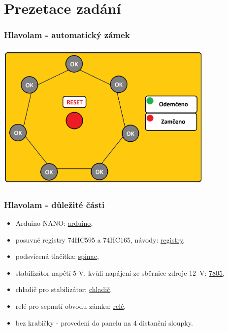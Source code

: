 \documentclass{beamer}
\begin{document}
\section{\texorpdfstring{Prezetace zadání}{Prezentace zadani}}
  \begin{frame}
    \frametitle{Hlavolam - automatický zámek}
    \begin{center}
      \includegraphics[width=0.8\textwidth]{obr/hlavolam.png}
    \end{center}
  \end{frame}
  \begin{frame}
    \frametitle{Hlavolam - důležité části}
    \begin{itemize}
      \item Arduino NANO: \href{https://www.gme.cz/klon-arduino-nano-v3-0-r3-ch340g}{arduino},
      \item posuvné registry 74HC595 a 74HC165, návody: \href{https://dronebotworkshop.com/shift-registers/}{registry},
      \item podsvícená tlačítka: \href{https://www.gme.cz/tlacitkovy-spinac-p-pb61412l-508}{spinac},
      \item stabilizátor napětí 5 V, kvůli napájení ze sběrnice zdroje 12~V: \href{https://www.gme.cz/stabilizator-pevneho-napeti-st-microelectronics-thomson-7805cv-stm}{7805},
      \item chladič pro stabilizátor: \href{https://www.gme.cz/v7142a-black}{chladič},
      \item relé pro sepnutí obvodu zámku: \href{https://www.gme.cz/jazyckova-rele-cosmo-reled1a-051-000}{relé},
      \item bez krabičky - provedení do panelu na 4 distanční sloupky.
    \end{itemize}
  \end{frame}
\end{document}
